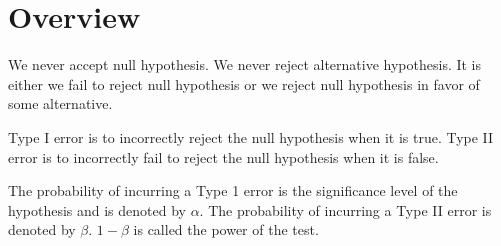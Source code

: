 \section{Overview}
We never accept null hypothesis. We never reject alternative hypothesis. 
It is either we fail to reject null hypothesis or we reject null hypothesis in favor of some alternative.
\begin{definition}
Type I error is to incorrectly reject the null hypothesis when it is true. Type II error is to incorrectly fail to reject the null hypothesis when it is false.

The probability of incurring a Type 1 error is the significance level of the hypothesis and is denoted by $\alpha$. The probability of incurring a Type II error is denoted by $\beta$. $1-\beta$ is called the power of the test.
\end{definition}


